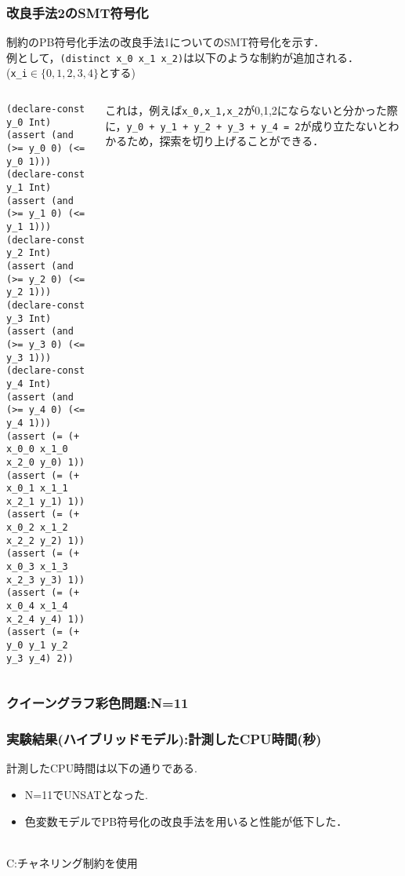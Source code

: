 \begin{frame}[fragile]\footnotesize
    \frametitle{改良手法2のSMT符号化}
    \distinct 制約のPB符号化手法の改良手法1についてのSMT符号化を示す．\\
    例として，\verb|(distinct x_0 x_1 x_2)|は以下のような制約が追加される．\\
    (\verb|x_i|$\in \{0,1,2,3,4\}$とする)

    \begin{columns}
        \begin{column}{0.5\textwidth}
            \begin{exampleblock}{}\scriptsize
\begin{verbatim}
(declare-const y_0 Int)
(assert (and (>= y_0 0) (<= y_0 1)))
(declare-const y_1 Int)
(assert (and (>= y_1 0) (<= y_1 1)))
(declare-const y_2 Int)
(assert (and (>= y_2 0) (<= y_2 1)))
(declare-const y_3 Int)
(assert (and (>= y_3 0) (<= y_3 1)))
(declare-const y_4 Int)
(assert (and (>= y_4 0) (<= y_4 1)))
(assert (= (+ x_0_0 x_1_0 x_2_0 y_0) 1))
(assert (= (+ x_0_1 x_1_1 x_2_1 y_1) 1))
(assert (= (+ x_0_2 x_1_2 x_2_2 y_2) 1))
(assert (= (+ x_0_3 x_1_3 x_2_3 y_3) 1))
(assert (= (+ x_0_4 x_1_4 x_2_4 y_4) 1))
(assert (= (+ y_0 y_1 y_2 y_3 y_4) 2))
\end{verbatim}
            \end{exampleblock}
        \end{column}
        \begin{column}{0.5\textwidth}\scriptsize
            これは，例えば\verb|x_0,x_1,x_2|が0,1,2にならないと分かった際に，\verb|y_0 + y_1 + y_2 + y_3 + y_4 = 2|が成り立たないとわかるため，探索を切り上げることができる．
        \end{column}
    \end{columns}

\end{frame}

\begin{frame}
    \frametitle{クイーングラフ彩色問題:N=11}
    
\end{frame}


\begin{frame}
    \frametitle{実験結果(ハイブリッドモデル):計測したCPU時間(秒)}
    計測したCPU時間は以下の通りである.
    \begin{block}{}
        {\tiny  }
    \end{block}
    \begin{itemize}
        \item N=11でUNSATとなった.
        \item 色変数モデルでPB符号化の改良手法を用いると性能が低下した．
    \end{itemize}
    \\
    {\footnotesize C:チャネリング制約を使用}\\
\end{frame}





\backupend

